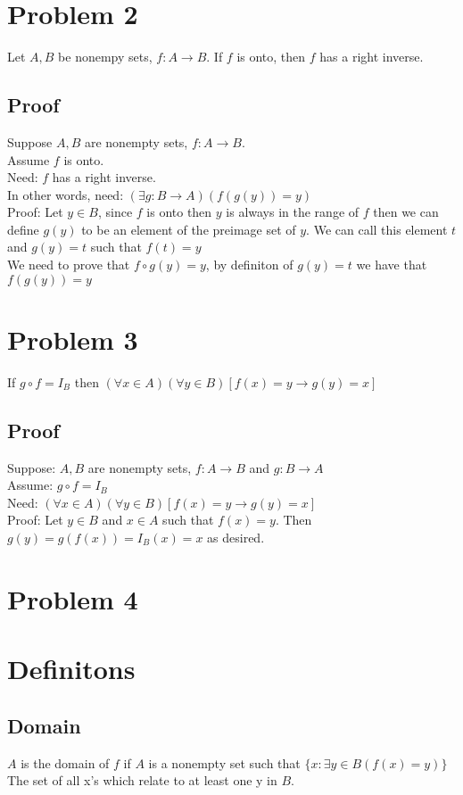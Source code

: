\documentclass{article}
\begin{document}
\section*{Problem 2}
Let $A,B$ be nonempy sets, $f:A \rightarrow B$. If $f$ is onto, then $f$ has a right inverse.
\subsection*{Proof}
Suppose $A, B$ are nonempty sets, $f: A \rightarrow B$.\\
Assume $f$ is onto.\\
Need: $f$ has a right inverse.\\
In other words, need: $(\exists g: B \rightarrow A)(f(g(y)) = y)$ \\
Proof: Let $y \in B$, since $f$ is onto then $y$ is always in the range of $f$ then we can define $g(y)$ to be an element of the preimage set of $y$. We can call this element $t$ and $g(y) = t$ such that $f(t) = y$\\
We need to prove that $f \circ g (y) = y$, by definiton of $g(y) = t$ we have that $f(g(y)) = y$ 

\section*{Problem 3}
If $g \circ f = I_B$ then $(\forall x \in A)(\forall y \in B)[f(x) = y \rightarrow g(y) = x]$
\subsection*{Proof}
Suppose: $A, B$ are nonempty sets, $f: A \rightarrow B$ and $g: B \rightarrow A$\\
Assume: $g \circ f = I_B$\\
Need: $(\forall x \in A)(\forall y \in B)[f(x) = y \rightarrow g(y) = x]$\\
Proof: Let $y \in B$ and $x \in A$ such that $f(x) = y$. Then $g(y) = g(f(x)) = I_B(x) = x$ as desired.

\section*{Problem 4}




\section*{Definitons}
\subsection*{Domain}
$A$ is the domain of $f$ if $A$ is a nonempty set such that $\{x: \exists y \in B (f(x) = y)\}$ \\
The set of all x's which relate to at least one y in $B$.
\end{document}
